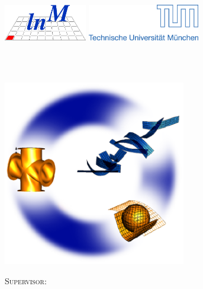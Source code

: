 \begin{titlepage}
\thispagestyle{empty}
\vspace{-1.5cm}
\includegraphics[height=1.5772cm]{./fig/lnm.eps}
\hfill
\includegraphics[height=1.5772cm]{./fig/tum.eps}
\vfill

\begin{center}
\Huge{\thesistitle}
\\
\vspace{0.2cm}
\LARGE{\Author}
\\
\vspace{0.2cm}
\large{\thesistype}
\end{center}
\vspace{0.1cm}
%
\begin{center}
\includegraphics[width=8cm]{fig/nilifem}
\end{center}
%
\vfill
%
\begin{minipage}[c]{1.0\textwidth}
\centering
{\large \scshape Supervisor:}\\
{\Supervisor}\\ %
\texttt{\Mail}\\
\end{minipage}

\end{titlepage}
